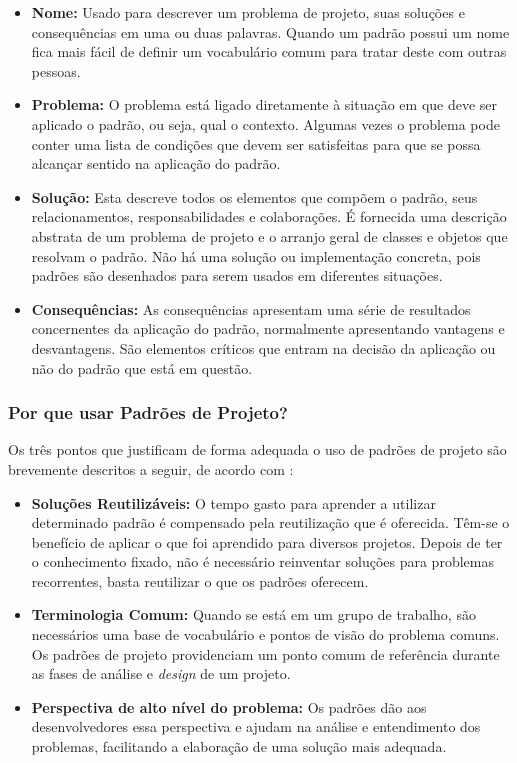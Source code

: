 \begin{itemize}
	\item \textbf{Nome:} Usado para descrever um problema de projeto, suas soluções e consequências em uma ou duas palavras. Quando um padrão possui um nome fica mais fácil de definir um vocabulário comum para tratar deste com outras pessoas.
	\item \textbf{Problema:} O problema está ligado diretamente à situação em que deve ser aplicado o padrão, ou seja, qual o contexto. Algumas vezes o problema pode conter uma lista de condições que devem ser satisfeitas para que se possa alcançar sentido na aplicação do padrão.
	\item \textbf{Solução:} Esta descreve todos os elementos que compõem o padrão, seus relacionamentos, responsabilidades e colaborações. É fornecida uma descrição abstrata de um problema de projeto e o arranjo geral de classes e objetos que resolvam o padrão. Não há uma solução ou implementação concreta, pois padrões são desenhados para serem usados em diferentes situações.
	\item \textbf{Consequências:} As consequências apresentam uma série de resultados concernentes da aplicação do padrão, normalmente apresentando vantagens e desvantagens. São elementos críticos que entram na decisão da aplicação ou não do padrão que está em questão.
\end{itemize}

\subsubsection{Por que usar Padrões de Projeto?}

Os três pontos que justificam de forma adequada o uso de padrões de projeto são brevemente descritos a seguir, de acordo com \cite{Shalloway:Trott:2004}:

\begin{itemize}
	\item \textbf{Soluções Reutilizáveis:} O tempo gasto para aprender a utilizar determinado padrão é compensado pela reutilização que é oferecida. Têm-se o benefício de aplicar o que foi aprendido para diversos projetos. Depois de ter o conhecimento fixado, não é necessário reinventar soluções para problemas recorrentes, basta reutilizar o que os padrões oferecem.
	\item \textbf{Terminologia Comum:} Quando se está em um grupo de trabalho, são necessários uma base de vocabulário e pontos de visão do problema comuns. Os padrões de projeto providenciam um ponto comum de referência durante as fases de análise e \textit{design} de um projeto.
	\item \textbf{Perspectiva de alto nível do problema:} Os padrões dão aos desenvolvedores essa perspectiva e ajudam na análise e entendimento dos problemas, facilitando a elaboração de uma solução mais adequada.
\end{itemize}

